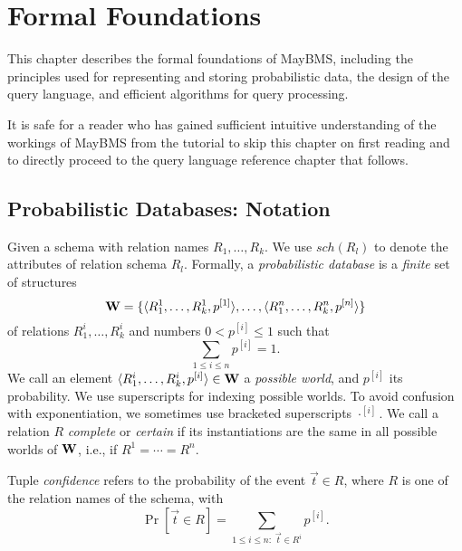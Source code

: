 



\chapter{Formal Foundations}


This chapter describes the formal foundations of MayBMS, including the
principles used for representing and storing probabilistic data, the
design of the query language, and efficient algorithms for query processing.

It is safe for a reader who has gained sufficient intuitive understanding
of the workings of MayBMS from the tutorial to skip this chapter on
first reading and to directly proceed to the query language reference
chapter that follows.



\section{Probabilistic Databases: Notation}
\label{sect:probdb}


\def\ww{{\bf W}}


Given a schema with relation names $R_1, \dots, R_k$. We use $sch(R_l)$ to denote the attributes of relation schema $R_l$.
Formally, 
a {\em probabilistic database}\/ is a {\em finite}\/ set of structures
\[
\ww = \{ \tuple{R_1^1, \dots, R_k^1, p^{[1]}}, \dots,
         \tuple{R_1^n, \dots, R_k^n, p^{[n]}} \}
\]
of relations $R_1^i, \dots, R_k^i$ and numbers $0 < p^{[i]} \le 1$ such that
\[
\sum_{1 \le i \le n} p^{[i]} = 1.
\]
%
We call an element $\tuple{R_1^i, \dots, R_k^i, p^{[i]}} \in \ww$
a {\em possible world}\/, and $p^{[i]}$ its probability.
We use superscripts for indexing possible worlds.
To avoid confusion with exponentiation,
we sometimes use bracketed superscripts $\cdot^{[i]}$.
%
We call a relation $R$ {\em complete}\/ or {\em certain}\/
if its instantiations are the same in all possible worlds of $\ww$, i.e., if $R^1 = \cdots = R^n$.

Tuple {\em confidence}\/ refers to the probability of the event $\vec{t} \in R$, where $R$ is one of the relation names of the schema, with
\[
\Pr[\vec{t} \in R] = \sum_{1 \le i \le n:\; \vec{t} \in R^i} p^{[i]}.
\]









